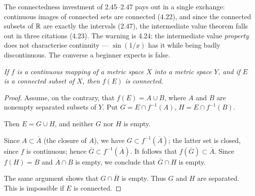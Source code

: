 
\begin{signpost}
The connectedness investment of 2.45--2.47 pays out in a single exchange:
continuous images of connected sets are connected (4.22), and since the
connected subsets of $\mathbb{R}$ are exactly the intervals (2.47), the intermediate
value theorem falls out in three citations (4.23). The warning is 4.24: the
intermediate value \emph{property} does not characterise continuity ---
$\sin(1/x)$ has it while being badly discontinuous. The converse a beginner
expects is false.
\end{signpost}

\emph{If $f$ is a continuous mapping of a metric space $X$ into a metric
space $Y$, and if $E$ is a connected subset of $X$, then $f(E)$ is
connected.}

\begin{proof}
Assume, on the contrary, that $f(E) = A \cup B$, where $A$ and $B$ are
nonempty separated subsets of $Y$. Put $G = E \cap f^{-1}(A)$,
$H = E \cap f^{-1}(B)$.

Then $E = G \cup H$, and neither $G$ nor $H$ is empty.

Since $A \subset \overline{A}$ (the closure of $A$), we have
$G \subset f^{-1}(\overline{A})$; the latter set is closed, since $f$ is
continuous; hence $\overline{G} \subset f^{-1}(\overline{A})$. It follows
that $f(\overline{G}) \subset \overline{A}$. Since $f(H) = B$ and
$\overline{A} \cap B$ is empty, we conclude that $\overline{G} \cap H$ is
empty.

The same argument shows that $G \cap \overline{H}$ is empty. Thus $G$ and $H$
are separated. This is impossible if $E$ is connected.
\end{proof}

